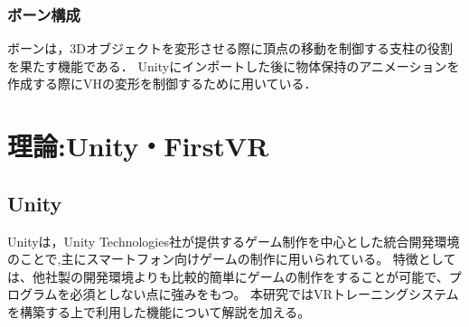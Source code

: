\documentclass{ltjsreport}
\begin{document}
		\subsection{ボーン構成}
			ボーンは，3Dオブジェクトを変形させる際に頂点の移動を制御する支柱の役割を果たす機能である．
			Unityにインポートした後に物体保持のアニメーションを作成する際にVHの変形を制御するために用いている．


\chapter{理論:Unity・FirstVR}
	\section{Unity}
		Unityは，Unity Technologies社が提供するゲーム制作を中心とした統合開発環境のことで,主にスマートフォン向けゲームの制作に用いられている。
		特徴としては、他社製の開発環境よりも比較的簡単にゲームの制作をすることが可能で、プログラムを必須としない点に強みをもつ。
		本研究ではVRトレーニングシステムを構築する上で利用した機能について解説を加える。
\end{document}
